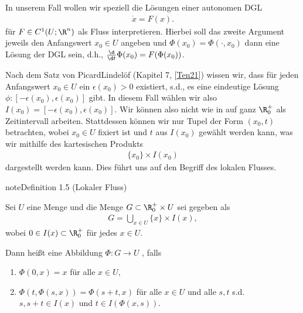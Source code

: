 \documentclass[letterpaper,10pt,english]{jupyterBook}
\begin{document}
In unserem Fall wollen wir speziell die Lösungen einer autonomen DGL
\begin{equation*}
\begin{split}\dot{x} = F(x).\end{split}
\end{equation*}
für \(F\in C^1(U;\R^n)\) als Fluss interpretieren. Hierbei soll das zweite Argument jeweils den Anfangswert
\(x_0\in U\) angeben und \(\Phi(x_0) = \Phi(\cdot, x_0)\) dann eine Lösung der DGL sein, d.h., \(\frac{\d}{\d t} \Phi(x_0) = F(\Phi(x_0))\).

Nach dem Satz von Picard\sphinxhyphen{}Lindelöf (Kapitel 7, {[}\hyperlink{cite.references:id10}{Ten21}{]}) wissen wir, dass für jeden Anfangswert \(x_0\in U\) ein \(\epsilon(x_0) >0\) existiert, s.d., es eine eindeutige Lösung \(\phi: [-\epsilon(x_0), \epsilon(x_0)]\) gibt. In diesem Fall wählen wir also \(I(x_0)=[-\epsilon(x_0), \epsilon(x_0)]\). Wir können also nicht wie in {\hyperref[\detokenize{ode/fluesse:def:Fluss}]{}} auf ganz \(\R^+_0\) als Zeitintervall arbeiten. Stattdessen können wir nur Tupel der Form \((x_0, t)\) betrachten, wobei \(x_0\in U\) fixiert ist und \(t\) aus \(I(x_0)\) gewählt werden kann, was wir mithilfe des kartesischen Produkts
\begin{align*}
\{x_0\}\times I(x_0)
\end{align*}
dargestellt werden kann. Dies führt uns auf den Begriff des lokalen Flusses.
\label{ode/fluesse:def:LokFluss}
\begin{sphinxadmonition}{note}{Definition 1.5 (Lokaler Fluss)}



Sei \(U\) eine Menge und die Menge \(G\subset \R^+_0\times U\) sei gegeben als
\begin{equation*}
\begin{split}G = \bigcup_{x\in U} \{x\}\times I(x),\end{split}
\end{equation*}
wobei \(0\in I(x)\subset \R^+_0\) für jedes \(x\in U\).

Dann heißt eine Abbildung \(\Phi: G\rightarrow U\) , falls
\begin{enumerate}
%
\item {} 
\(\Phi(0,x) = x\) für alle \(x\in U\),

\item {} 
\(\Phi(t, \Phi(s, x)) = \Phi(s+t, x)\) für alle \(x\in U\) und alle \(s,t\) s.d. \(s, s+t\in I(x)\) und \(t\in I(\Phi(x,s))\).

\end{enumerate}
\end{sphinxadmonition}
\end{document}
